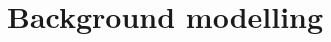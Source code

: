 \begin{figure}[!htbp]
    \label{Figure:Chapter6_ZPT_Reweighting_ee}
\end{figure}


\section{Background modelling}
\label{Section:Chapter7_Background_Modelling}









